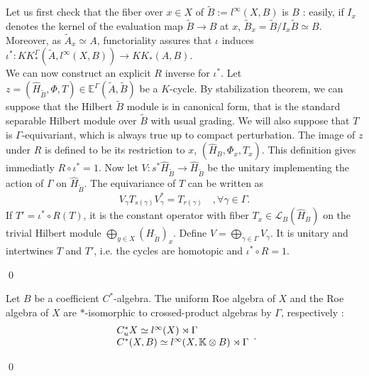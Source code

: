 \begin{dem}
Let us first check that the fiber over $x\in X$ of $\tilde B :=l^\infty(X,B)$ is $B$ : easily, if $I_x$ denotes the kernel of the evaluation map $\tilde B \rightarrow B$ at $x$, $\tilde B_x = \tilde B / I_x \tilde B\simeq B $. Moreover, as $\tilde A_x \simeq A$, functoriality assures that $\iota$ induces $\iota^* : KK_*^\Gamma(\tilde A, l^\infty(X, B))\rightarrow KK_*(A, B)$.\\

We can now construct an explicit $R$ inverse for $\iota^*$. Let $z=(\hat H_{\tilde B},\Phi, T)\in \mathbb E^\Gamma(\tilde A,\tilde B)$ be a $K$-cycle. By stabilization theorem, we can suppose that the Hilbert $\tilde B$ module is in canonical form, that is the standard separable Hilbert module over $\tilde B$ with usual grading. We will also suppose that $T$ is $\Gamma$-equivariant, which is always true up to compact perturbation. The image of $z$ under $R$ is defined to be its restriction to $x$, $(\hat H_B,\Phi_x,T_x)$. This definition gives immediatly $R\circ \iota^* = 1$. Now let $V : s^* \hat H_{\tilde B}\rightarrow \hat H_{\tilde B}$ be the unitary implementing the action of $\Gamma$ on $\hat H_{\tilde B}$. The equivariance of $T$ can be written as 
\[V_\gamma T_{s(\gamma)} V_\gamma^* = T_{r(\gamma)}\quad,\forall \gamma \in \Gamma. \]
If $T' = \iota^*\circ R(T)$, it is the constant operator with fiber $T_x\in \mathcal L_B(\hat H_B)$ on the trivial Hilbert module $\bigoplus_{y\in X}(H_{\tilde B})_x $. Define $V=\bigoplus_{\gamma \in \Gamma} V_\gamma$. It is unitary and intertwines $T$ and $T'$, i.e. the cycles are homotopic and $\iota^*\circ R = 1$.

\qed

\begin{lem}
Let $B$ be a coefficient $C^*$-algebra. The uniform Roe algebra of $X$  and the Roe algebra of $X$ are $*$-isomorphic to crossed-product algebras by $\Gamma$, respectively : 
\[\begin{array}{ll} C_u^* X \simeq l^\infty(X) \rtimes \Gamma \\ C^* (X,B) \simeq l^\infty(X,\mathbb K\otimes B) \rtimes \Gamma \end{array}.\]
\end{lem}

\begin{dem}

\qed
\end{dem}
\end{dem}


















